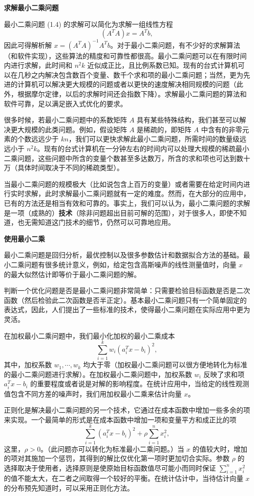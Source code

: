 \documentclass[UTF8,12pt,a4paper,fontset=fandol]{ctexart}
\begin{document}
\noindent\textbf{求解最小二乘问题}

最小二乘问题 (1.4) 的求解可以简化为求解一组线性方程
\[
  (A^TA)x=A^Tb,
\]
因此可得解析解 $x=(A^TA)^{-1}A^Tb$。对于最小二乘问题，有不少好的求解算法（和软件实现），这些算法的精度和可靠性都很高。最小二乘问题可以在有限时间内进行求解，此时间和 $n^2k$ 近似成正比，且比例系数已知。现有的台式计算机可以在几秒之内解决包含数百个变量、数千个求和项的最小二乘问题；当然，更为先进的计算机可以解决更大规模的问题或者以更快的速度解决相同规模的问题（此外，根据摩尔定律，以后的求解时间还会指数下降）。求解最小二乘问题的算法和软件可靠，足以满足嵌入式优化的要求。

很多时候，若最小二乘问题中的系数矩阵 $A$ 具有某些特殊结构，我们甚至可以解决更大规模的此类问题。例如，假设矩阵 $A$ 是稀疏的，即矩阵 $A$ 中含有的非零元素的个数远远少于 $kn$，我们可以更快求解此最小二乘问题，所需时间的数量级远远小于 $n^2k$。现有的台式计算机在一分钟左右的时间内可以处理大规模的稀疏最小二乘问题，这些问题中所含的变量个数甚至多达数万，所含的求和项也可达到数十万（具体时间取决于不同的稀疏类型）。

当最小二乘问题的规模极大（比如说包含上百万的变量）或者需要在给定时间内进行实时求解，此时求解最小二乘问题就有一定的难度。然而，在大部分的应用中，已有的方法还是相当有效和可靠的。事实上，我们可以认为，最小二乘问题的求解是一项（成熟的）\textbf{技术}（除非问题超出目前可解的范围），对于很多人，即使不知道，也无需知道这门技术的细节，仍然可以可靠地应用。

\noindent\textbf{使用最小二乘}

最小二乘问题是回归分析，最优控制以及很多参数估计和数据拟合方法的基础。最小二乘问题有很多统计意义，例如，给定包含高斯噪声的线性测量值时，向量 $x$ 的最大似然估计即等价于最小二乘问题的解。

判断一个优化问题是否是最小二乘问题非常简单：只需要检验目标函数是否是二次函数（然后检验此二次函数是否半正定）。基本最小二乘问题只有一个简单固定的表达式，因此，人们提出了一些标准的技术，使得最小二乘问题在实际应用中更为灵活。

在加权最小二乘问题中，我们最小化加权的最小二乘成本
\[
  \sum_{i=1}^k w_i(a_i^Tx-b_i)^2,
\]
其中，加权系数 $w_1,\cdots,w_k$ 均大于零（加权最小二乘问题可以很方便地转化为标准的最小二乘问题进行求解）。在加权最小二乘问题中，加权系数 $w_i$ 反映了求和项 $a_i^Tx-b_i$ 的重要程度或者说是对解的影响程度。在统计应用中，当给定的线性观测值包含不同方差的噪声时，我们用加权最小二乘来估计向量 $x$。

正则化是解决最小二乘问题的另一个技术，它通过在成本函数中增加一些多余的项来实现。一个最简单的形式是在成本函数中增加一项和变量平方和成正比的项
\[
  \sum_{i=1}^k (a_i^Tx-b_i)^2+\rho\sum_{i=1}^n x_i^2,
\]
这里，$\rho>0$。（此问题亦可以转化为标准最小二乘问题。）当 $x$ 的值较大时，增加的项对其施加一个惩罚，其得到的解比仅优化第一项时更加切合实际。参数 $\rho$ 的选择取决于使用者，选择原则是使原始目标函数值尽可能小而同时保证 $\sum_{i=1}^n x_i^2$ 的值不能太大，在二者之间取得一个较好的平衡。在统计估计中，当待估计向量 $x$ 的分布预先知道时，可以采用正则化方法。
\end{document}
